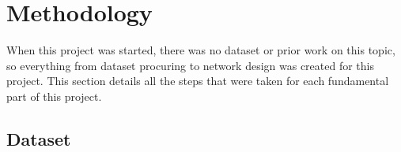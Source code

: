 \documentclass[a4paper,11pt,notitlepage]{article}
\begin{document}
\newpage

\section{Methodology}


When this project was started, there was no dataset or prior work on this topic, so everything from dataset procuring to network design was created for this project. This section details all the steps that were taken for each fundamental part of this project.

\subsection{Dataset}

\end{document}
